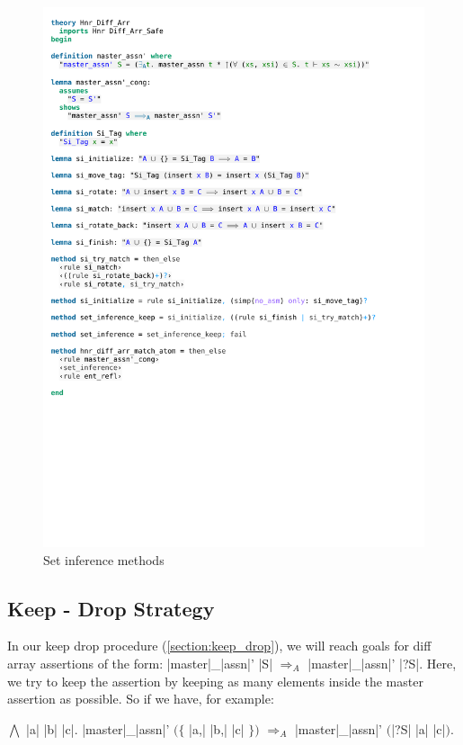 \begin{figure}[!htpb]
    \includegraphics[trim={0 9,2cm 0 13,6cm}, clip, width=1.00\textwidth]{figures/Theory_Hnr_Diff_Arr_SI.pdf}
    \caption[Set inference methods]{Set inference methods}
    \label{fig:si_methods}
\end{figure}

\subsection{Keep - Drop Strategy}

\begin{samepage}
In our keep drop procedure (\autoref{section:keep_drop}), we will reach goals for diff array assertions of the form: |master|\_|assn|' |S| $\Longrightarrow_A$ |master|\_|assn|' |?S|. Here, we try to keep the assertion by keeping as many elements inside the master assertion as possible. So if we have, for example:\nopagebreak


\noindent$\bigwedge$ |a| |b| |c|. |master|\_|assn|' $(\{$ |a,| |b,| |c| $\})$ $\Longrightarrow_A$ |master|\_|assn|' $($|?S| |a| |c|$)$.
\end{samepage}

